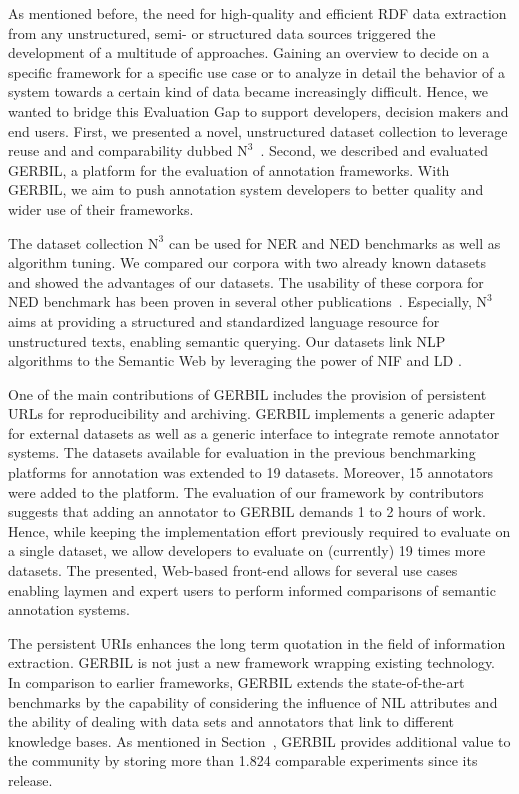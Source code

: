 As mentioned before, the need for high-quality and efficient RDF data extraction from any unstructured, semi- or structured data sources triggered the development of a multitude of approaches. 
Gaining an overview to decide on a specific framework for a specific use case or to analyze in detail the behavior of  a system towards a certain kind of data became increasingly difficult.
Hence, we wanted to bridge this Evaluation Gap to  support developers, decision makers and end users.
First, we presented a novel, unstructured dataset collection to leverage reuse and and comparability dubbed $\mbox{N}^3$~\cite{n3}. 
Second, we described and evaluated GERBIL, a platform for the evaluation of annotation frameworks. With GERBIL, we aim to push annotation system developers to better quality and wider use of their frameworks.

The dataset collection $\mbox{N}^3$ can be used for \ac{NER}  and \ac{NED}  benchmarks as well as algorithm tuning.
We compared our corpora with two already known datasets and showed the advantages of our datasets.
The usability of these corpora for \ac{NED}  benchmark has been proven in several other publications~\cite{agdistis_iswc,GER+13,GERBIL}.
Especially, $\mbox{N}^3$ aims at providing a structured and standardized language resource for unstructured texts, enabling semantic querying.
Our datasets link \ac{NLP}  algorithms to the Semantic Web by leveraging the power of NIF and \ac{LD} .

One of the main contributions of GERBIL includes the provision of persistent URLs for reproducibility and archiving.
GERBIL implements a generic adapter for external datasets as well as a generic interface to integrate remote annotator systems.
The datasets available for evaluation in the previous benchmarking platforms for annotation was extended to 19 datasets. 
Moreover, 15 annotators were added to the platform. 
The evaluation of our framework by contributors suggests that adding an annotator to GERBIL demands 1 to 2 hours of work. 
Hence, while keeping the implementation effort previously required to evaluate on a single dataset, we allow developers to evaluate on (currently) 19 times more datasets.
The presented, Web-based front-end allows for several use cases enabling laymen and expert users to perform informed  comparisons of semantic annotation systems.

The persistent URIs enhances the long term quotation in the field of information extraction.
GERBIL is not just a new framework wrapping existing technology. 
In comparison to earlier frameworks, GERBIL extends the state-of-the-art benchmarks by the capability of considering the influence of NIL attributes and the ability of dealing with data sets and annotators that link to different knowledge bases.
As mentioned in Section~\label{sec:currentNumbersForGERBIL}, GERBIL provides additional value to the community by storing more than 1.824 comparable experiments since its release. 

